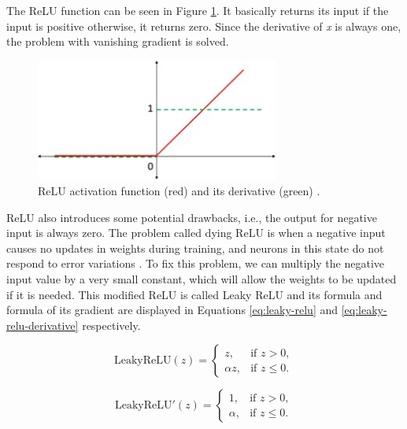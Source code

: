 The ReLU function can be seen in Figure \ref{fig:relu}. It basically returns its input if the input is positive otherwise, it returns zero. Since the derivative of \textit{x} is always one, the problem with vanishing gradient is solved. 

\begin{figure}[H]
\begin{centering}
\includegraphics[width=8cm]{assets/images/relu.jpg}
\par\end{centering}
\caption{ReLU activation function (red) and its derivative (green) \cite{Santosh2022-2}.}
\label{fig:relu}
\end{figure}

ReLU also introduces some potential drawbacks, i.e., the output for negative input is always zero. The problem called dying ReLU \cite{Dubey2022, Santosh2022-2, Aby2025} is when a negative input causes no updates in weights during training, and neurons in this state do not respond to error variations \cite{Santosh2022-2}. To fix this problem, we can multiply the negative input value by a very small constant, which will allow the weights to be updated if it is needed. This modified ReLU is called Leaky ReLU \cite{Maas2013} and its formula and formula of its gradient are displayed in Equations \ref{eq:leaky-relu} and \ref{eq:leaky-relu-derivative} respectively.

\noindent
\begin{multicols}{2} %
    \begin{equation}
    \text{LeakyReLU}(z) =
    \begin{cases} 
        z, & \text{if } z > 0, \\
        \alpha z, & \text{if } z \leq 0.
    \end{cases}
    \label{eq:leaky-relu}
    \end{equation}

    \begin{equation}
    \text{LeakyReLU}'(z) =
    \begin{cases} 
        1, & \text{if } z > 0, \\
        \alpha, & \text{if } z \leq 0.
    \end{cases}
    \label{eq:leaky-relu-derivative}
    \end{equation}
\end{multicols}

